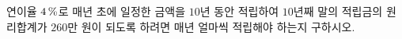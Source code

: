 연이율 $4\mkern3mu \%$로 매년 초에 일정한 금액을 $10$년 동안 적립하여 $10$년째 말의 적립금의 원리합계가 $260$만 원이 되도록 하려면 매년 얼마씩 적립해야 하는지 구하시오. 
